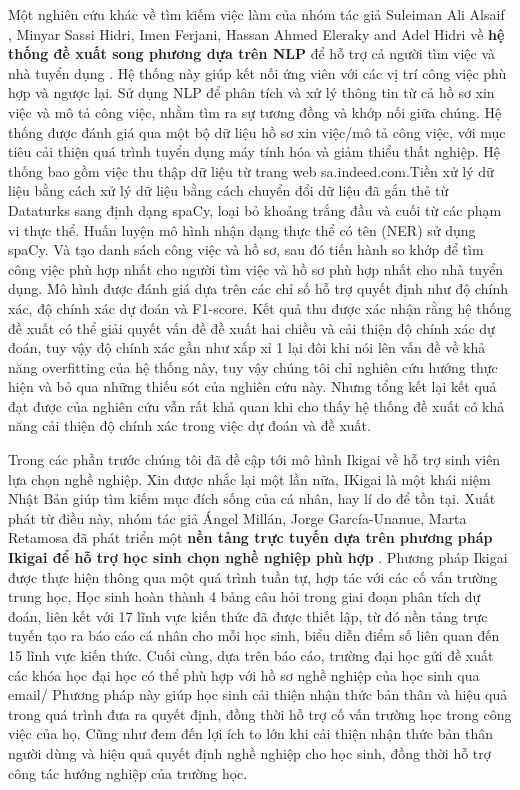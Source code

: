 Một nghiên cứu khác về tìm kiếm việc làm của nhóm tác giả Suleiman Ali Alsaif , Minyar Sassi Hidri, Imen Ferjani, Hassan Ahmed Eleraky and Adel Hidri về \textbf{hệ thống đề xuất song phương dựa trên NLP} để hỗ trợ cả người tìm việc và nhà tuyển dụng \cite{suleiman}. Hệ thống này giúp kết nối ứng viên với các vị trí công việc phù hợp và ngược lại.  Sử dụng NLP để phân tích và xử lý thông tin từ cả hồ sơ xin việc và mô tả công việc, nhằm tìm ra sự tương đồng và khớp nối giữa chúng. Hệ thống được đánh giá qua một bộ dữ liệu hồ sơ xin việc/mô tả công việc, với mục tiêu cải thiện quá trình tuyển dụng máy tính hóa và giảm thiểu thất nghiệp. Hệ thống bao gồm việc thu thập dữ liệu từ trang web sa.indeed.com.Tiền xử lý dữ liệu bằng cách xử lý dữ liệu bằng cách chuyển đổi dữ liệu đã gắn thẻ từ Dataturks sang định dạng spaCy, loại bỏ khoảng trắng đầu và cuối từ các phạm vi thực thể. Huấn luyện mô hình nhận dạng thực thể có tên (NER) sử dụng spaCy. Và tạo danh sách công việc và hồ sơ, sau đó tiến hành so khớp để tìm công việc phù hợp nhất cho người tìm việc và hồ sơ phù hợp nhất cho nhà tuyển dụng. Mô hình được đánh giá dựa trên các chỉ số hỗ trợ quyết định như độ chính xác, độ chính xác dự đoán và F1-score. Kết quả thu được xác nhận rằng hệ thống đề xuất có thể giải quyết vấn đề đề xuất hai chiều và cải thiện độ chính xác dự đoán, tuy vậy độ chính xác gần như xấp xỉ 1 lại đôi khi nói lên vấn đề về khả năng overfitting của hệ thống này, tuy vậy chúng tôi chỉ nghiên cứu hướng thực hiện và bỏ qua những thiếu sót của nghiên cứu này. Nhưng tổng kết lại kết quả đạt được của nghiên cứu vẫn rất khả quan khi  cho thấy hệ thống đề xuất có khả năng cải thiện độ chính xác trong việc dự đoán và đề xuất.

Trong các phần trước chúng tôi đã đề cập tới mô hình Ikigai về hỗ trợ sinh viên lựa chọn nghề nghiệp. Xin được nhắc lại một lần nữa, IKigai là một khái niệm Nhật Bản giúp tìm kiếm mục đích sống của cá nhân, hay lí do để tồn tại. Xuất phát từ điều này, nhóm tác giả Ángel Millán, Jorge García-Unanue, Marta Retamosa đã phát triển một\textbf{ nền tảng trực tuyến dựa trên phương pháp Ikigai để hỗ trợ học sinh chọn nghề nghiệp phù hợp} \cite{angel}. Phương pháp Ikigai được thực hiện thông qua một quá trình tuần tự, hợp tác với các cố vấn trường trung học, Học sinh hoàn thành 4 bảng câu hỏi trong giai đoạn phân tích dự đoán, liên kết với 17 lĩnh vực kiến thức đã được thiết lập, từ đó nền tảng trực tuyến tạo ra báo cáo cá nhân cho mỗi học sinh, biểu diễn điểm số liên quan đến 15 lĩnh vực kiến thức. Cuối cùng, dựa trên báo cáo, trường đại học gửi đề xuất các khóa học đại học có thể phù hợp với hồ sơ nghề nghiệp của học sinh qua email/ Phương pháp này giúp học sinh cải thiện nhận thức bản thân và hiệu quả trong quá trình đưa ra quyết định, đồng thời hỗ trợ cố vấn trường học trong công việc của họ. Cũng như đem đến lợi ích to lớn khi cải thiện nhận thức bản thân người dùng và hiệu quả quyết định nghề nghiệp cho học sinh, đồng thời hỗ trợ công tác hướng nghiệp của trường học.

